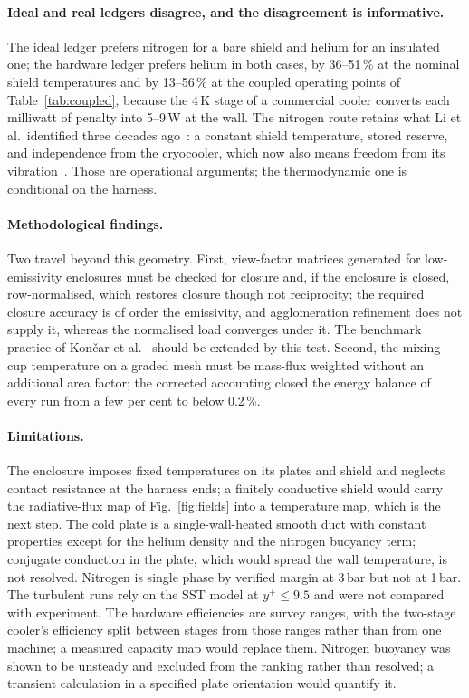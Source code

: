 \documentclass[preprint,12pt]{elsarticle}
\begin{document}
\paragraph{Ideal and real ledgers disagree, and the disagreement is informative.} The ideal
ledger prefers nitrogen for a bare shield and helium for an insulated one; the hardware
ledger prefers helium in both cases, by 36--51\,\% at the nominal shield temperatures and by
13--56\,\% at the coupled operating points of Table~\ref{tab:coupled}, because the 4\,K
stage of a commercial cooler converts each milliwatt of penalty into 5--9\,W at the wall. The nitrogen route
retains what Li et al.\ identified three decades ago~\cite{Li1990SMESIntercepts}: a constant
shield temperature, stored reserve, and independence from the cryocooler, which now also
means freedom from its vibration~\cite{Tomaru2004Vibration}. Those are operational
arguments; the thermodynamic one is conditional on the harness.

\paragraph{Methodological findings.} Two travel beyond this geometry. First, view-factor
matrices generated for low-emissivity enclosures must be checked for closure and, if the
enclosure is closed, row-normalised, which restores closure though not reciprocity; the
required closure accuracy is of order the emissivity, and agglomeration refinement does not
supply it, whereas the normalised load converges under it. The benchmark practice of
Končar et al.~\cite{Koncar2018CFDRadiation} should be extended by this test. Second, the
mixing-cup temperature on a graded mesh must be mass-flux weighted without an additional
area factor; the corrected accounting closed the energy balance of every run from a few per
cent to below 0.2\,\%.

\paragraph{Limitations.} The enclosure imposes fixed temperatures on its plates and shield and
neglects contact resistance at the harness ends; a finitely conductive shield would carry the
radiative-flux map of Fig.~\ref{fig:fields} into a temperature map, which is the next step.
The cold plate is a single-wall-heated smooth duct with constant properties except for the
helium density and the nitrogen buoyancy term; conjugate conduction in the plate, which would
spread the wall temperature, is not resolved. Nitrogen is single phase by verified margin at
3\,bar but not at 1\,bar. The turbulent runs rely on the SST model at $y^+\le 9.5$ and were
not compared with experiment. The hardware efficiencies are survey ranges, with the two-stage cooler's efficiency split
between stages from those ranges rather than from one machine; a measured capacity map would
replace them. Nitrogen buoyancy was shown to be unsteady and excluded from the ranking rather
than resolved; a transient calculation in a specified plate orientation would quantify it.
\end{document}
